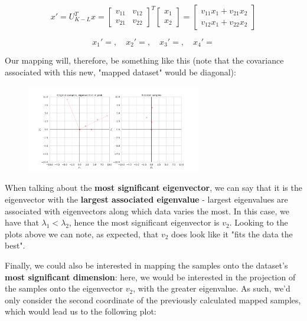 \documentclass[12pt]{article}
\begin{document}
\begin{enumerate}[leftmargin=\labelsep]
  \begin{equation*}
    x' = U_{K-L}^T x
    = \begin{bmatrix}
      v_{11} & v_{12} \\
      v_{21} & v_{22}
    \end{bmatrix}^T
    \begin{bmatrix}
      x_1 \\
      x_2
    \end{bmatrix}
    = \begin{bmatrix}
      v_{11} x_1 + v_{21} x_2 \\
      v_{12} x_1 + v_{22} x_2
    \end{bmatrix}
  \end{equation*}

  \begin{equation*}
    x_1' = , \quad x_2' = ,
    \quad x_3' = , \quad x_4' = 
  \end{equation*}

  Our mapping will, therefore, be something like this (note that
  the covariance associated with this new, "mapped dataset" would be diagonal):

  \begin{figure}[h]
    \centering
    \includegraphics[width=0.68\textwidth]{assets/ex-1/kl-transform.png}
    \label{fig:kl-transform}
  \end{figure}

  When talking about the \textbf{most significant eigenvector}, we can say that it is the
  eigenvector with the \textbf{largest associated eigenvalue} - largest eigenvalues
  are associated with eigenvectors along which data varies the most. In this case, we have that $\lambda_1 < \lambda_2$,
  hence the most significant eigenvector is $v_2$. Looking to the plots above we
  can note, as expected, that $v_2$ does look like it "fits the data the best".

  Finally, we could also be interested in mapping the samples onto the dataset's
  \textbf{most significant dimension}: here, we would be interested in the projection
  of the samples onto the eigenvector $v_2$, with the greater eigenvalue. As such,
  we'd only consider the second coordinate of the previously calculated mapped samples,
  which would lead us to the following plot:


\end{enumerate}
\end{document}

